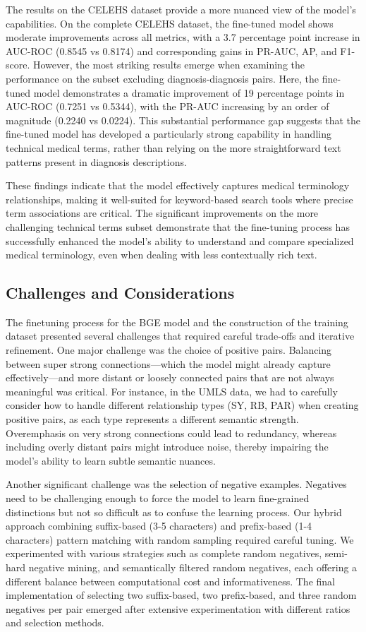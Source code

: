 The results on the CELEHS dataset provide a more nuanced view of the model's capabilities. On the complete CELEHS dataset, the fine-tuned model shows moderate improvements across all metrics, with a 3.7 percentage point increase in AUC-ROC (0.8545 vs 0.8174) and corresponding gains in PR-AUC, AP, and F1-score. However, the most striking results emerge when examining the performance on the subset excluding diagnosis-diagnosis pairs. Here, the fine-tuned model demonstrates a dramatic improvement of 19 percentage points in AUC-ROC (0.7251 vs 0.5344), with the PR-AUC increasing by an order of magnitude (0.2240 vs 0.0224). This substantial performance gap suggests that the fine-tuned model has developed a particularly strong capability in handling technical medical terms, rather than relying on the more straightforward text patterns present in diagnosis descriptions.

These findings indicate that the model effectively captures medical terminology relationships, making it well-suited for keyword-based search tools where precise term associations are critical. The significant improvements on the more challenging technical terms subset demonstrate that the fine-tuning process has successfully enhanced the model's ability to understand and compare specialized medical terminology, even when dealing with less contextually rich text.

\subsection{Challenges and Considerations}
\label{subsec:challenges_fin}

The finetuning process for the BGE model and the construction of the training dataset presented several challenges that required careful trade-offs and iterative refinement. One major challenge was the choice of positive pairs. Balancing between super strong connections—which the model might already capture effectively—and more distant or loosely connected pairs that are not always meaningful was critical. For instance, in the UMLS data, we had to carefully consider how to handle different relationship types (SY, RB, PAR) when creating positive pairs, as each type represents a different semantic strength. Overemphasis on very strong connections could lead to redundancy, whereas including overly distant pairs might introduce noise, thereby impairing the model's ability to learn subtle semantic nuances.

Another significant challenge was the selection of negative examples. Negatives need to be challenging enough to force the model to learn fine-grained distinctions but not so difficult as to confuse the learning process. Our hybrid approach combining suffix-based (3-5 characters) and prefix-based (1-4 characters) pattern matching with random sampling required careful tuning. We experimented with various strategies such as complete random negatives, semi-hard negative mining, and semantically filtered random negatives, each offering a different balance between computational cost and informativeness. The final implementation of selecting two suffix-based, two prefix-based, and three random negatives per pair emerged after extensive experimentation with different ratios and selection methods.

